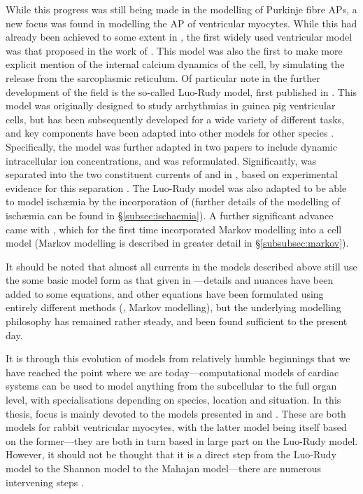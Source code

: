 \documentclass[../thesis-main.tex]{subfiles}
\begin{document}
 While this progress was still being made in the modelling of Purkinje fibre APs, a new focus was found in modelling the AP of ventricular myocytes. While this had already been achieved to some extent in \citet{Krause1966}, the first widely used ventricular model was that proposed in the work of \citet{Beeler1977}. This model was also the first to make more explicit mention of the internal calcium dynamics of the cell, by simulating the \ca{} release from the sarcoplasmic reticulum. Of particular note in the further development of the field is the so-called Luo-Rudy model, first published in \citet{Luo1991}. This model was originally designed to study arrhythmias in guinea pig ventricular cells, but has been subsequently developed for a wide variety of different tasks, and key components have been adapted into other models for other species \citep{Shaw1997a, Shaw1997b, Wagner1999, Viswanathan1999, Garfinkel2000, Shannon2004, Mahajan2008}. Specifically, the model was further adapted in two papers \citep{Luo1994, Luo1994a} to include dynamic intracellular ion concentrations, and \ica{} was reformulated. Significantly, \ik{} was separated into the two constituent currents of \ikr{} and \iks{} in \citet{Zeng1995}, based on experimental evidence for this separation \citep{Sanguinetti1990}. The Luo-Rudy model was also adapted to be able to model isch\ae mia by the incorporation of \ikatp{} \citep{Shaw1997} (further details of the modelling of isch\ae mia can be found in \S\ref{subsec:ischaemia}). A further significant advance came with \citet{Clancy1999}, which for the first time incorporated Markov modelling into a cell model (Markov modelling is described in greater detail in \S\ref{subsubsec:markov}).
 
 It should be noted that almost all currents in the models described above still use the some basic model form as that given in \citet{Hodgkin1952}---details and nuances have been added to some equations, and other equations have been formulated using entirely different methods (\eg, Markov modelling), but the underlying modelling philosophy has remained rather steady, and been found sufficient to the present day.
 
 It is through this evolution of models from relatively humble beginnings that we have reached the point where we are today---computational models of cardiac systems can be used to model anything from the subcellular to the full organ level, with specialisations depending on species, location and situation. In this thesis, focus is mainly devoted to the models presented in \citet{Shannon2004} and \citet{Mahajan2008}. These are both models for rabbit ventricular myocytes, with the latter model being itself based on the former---they are both in turn based in large part on the Luo-Rudy model. However, it should not be thought that it is a direct step from the Luo-Rudy model to the Shannon model to the Mahajan model---there are numerous intervening steps \citep{Zeng1995, Puglisi2001, Bassani2004}.
 
\end{document}
